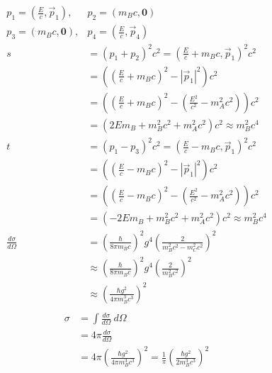 \documentclass{article}
\begin{document}
\begin{equation}
    \begin{split}
        p_1 = \left(\frac{E}{c}, \vec{p}_1\right), & p_2 = \left(m_Bc, \mathbf{0}\right) \\
        p_3 = \left(m_Bc, \mathbf{0}\right), & p_4 = \left(\frac{E}{c}, \vec{p}_4\right) \\
        s & = \left(p_1 + p_2\right)^2c^2 = \left(\frac{E}{c} + m_Bc, \vec{p}_1\right)^2c^2 \\
        & = \left(\left(\frac{E}{c} + m_Bc\right)^2 - \left|\vec{p}_1\right|^2\right)c^2 \\
        & = \left(\left(\frac{E}{c} + m_Bc\right)^2 - \left(\frac{E^2}{c^2} - m_A^2c^2\right)\right)c^2 \\
        & = \left(2Em_B + m_B^2c^2 + m_A^2c^2\right)c^2 \approx m_B^2c^4 \\
        t & = \left(p_1 - p_3\right)^2c^2 = \left(\frac{E}{c} - m_Bc, \vec{p}_1\right)^2c^2 \\
        & = \left(\left(\frac{E}{c} - m_Bc\right)^2 - \left|\vec{p}_1\right|^2\right)c^2 \\
        & = \left(\left(\frac{E}{c} - m_Bc\right)^2 - \left(\frac{E^2}{c^2} - m_A^2c^2\right)\right)c^2 \\
        & = \left(-2Em_B + m_B^2c^2 + m_A^2c^2\right)c^2 \approx m_B^2c^4 \\
        \frac{d\sigma}{d\Omega} & = \left(\frac{\hbar}{8\pi m_Bc}\right)^2g^4\left(\frac{2}{m_B^2c^2 - m_C^2c^2}\right)^2 \\
        & \approx \left(\frac{\hbar}{8\pi m_Bc}\right)^2g^4\left(\frac{2}{m_B^2c^2}\right)^2 \\
        & \approx \left(\frac{\hbar g^2}{4\pi m_B^3c^3}\right)^2 \\
    \end{split}
\end{equation}
\begin{equation}
    \begin{split}
        \sigma & = \int \frac{d\sigma}{d\Omega} \ d\Omega \\
        & = 4\pi \frac{d\sigma}{d\Omega} \\
        & = 4\pi \left(\frac{\hbar g^2}{4\pi m_B^3c^3}\right)^2 = \frac{1}{\pi} \left(\frac{\hbar g^2}{2 m_B^3c^3}\right)^2
    \end{split}
\end{equation}
\end{document}
